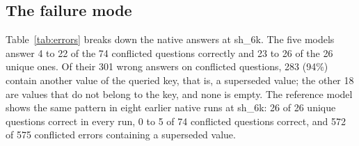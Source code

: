 \documentclass{CUP-JNL-NLP}
\newcommand{\sub}[1]{\textsf{sh\_#1}}                    %
\begin{document}
\subsection{The failure mode}
\label{sec:failure}

Table~\ref{tab:errors} breaks down the native answers at \sub{6k}. The five models answer 4 to 22 of the 74 conflicted questions correctly and 23 to 26 of the 26 unique ones. Of their 301 wrong answers on conflicted questions, 283 (94\%) contain another value of the queried key, that is, a superseded value; the other 18 are values that do not belong to the key, and none is empty. The reference model shows the same pattern in eight earlier native runs at \sub{6k}: 26 of 26 unique questions correct in every run, 0 to 5 of 74 conflicted questions correct, and 572 of 575 conflicted errors containing a superseded value.

\begin{table}[tbp]\centering
\caption{Native errors on the 74 conflicted questions of \sub{6k}, and a within-question control. ``Clean page'' denotes the 54 conflicted questions for which the deletion plan removes every superseded version of the queried key and keeps the newest, so that the edited page states only the current value. The set is fixed by the plan and is the same for all models.}
\label{tab:errors}
\end{table}
\end{document}
